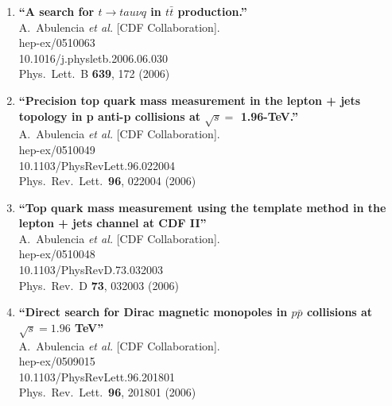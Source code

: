 \documentclass{article}
\begin{document}
\begin{enumerate}
\item%
{\bf ``A search for $t \to tau \nu q$ in $t\bar{t}$ production.''}
  \\{}A.~Abulencia {\it et al.}  [CDF Collaboration].
  \\{}hep-ex/0510063
    \\{}10.1016/j.physletb.2006.06.030
\\{}Phys.\ Lett.\ B {\bf 639}, 172 (2006) %


\item%
{\bf ``Precision top quark mass measurement in the lepton + jets topology in p anti-p collisions at $\sqrt{s}=$ 1.96-TeV.''}
  \\{}A.~Abulencia {\it et al.}  [CDF Collaboration].
  \\{}hep-ex/0510049
    \\{}10.1103/PhysRevLett.96.022004
\\{}Phys.\ Rev.\ Lett.\  {\bf 96}, 022004 (2006) %


\item%
{\bf ``Top quark mass measurement using the template method in the lepton + jets channel at CDF II''}
  \\{}A.~Abulencia {\it et al.}  [CDF Collaboration].
  \\{}hep-ex/0510048
    \\{}10.1103/PhysRevD.73.032003
\\{}Phys.\ Rev.\ D {\bf 73}, 032003 (2006) %


\item%
{\bf ``Direct search for Dirac magnetic monopoles in $p\bar{p}$ collisions at $\sqrt{s} = 1.96$ TeV''}
  \\{}A.~Abulencia {\it et al.}  [CDF Collaboration].
  \\{}hep-ex/0509015
    \\{}10.1103/PhysRevLett.96.201801
\\{}Phys.\ Rev.\ Lett.\  {\bf 96}, 201801 (2006) %



\end{enumerate}
\end{document}
